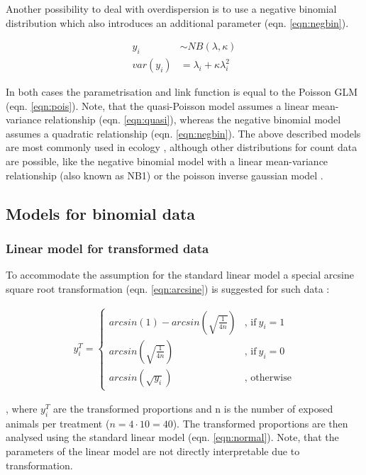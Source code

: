 \documentclass{scrartcl}
\begin{document}
Another possibility to deal with overdispersion is to use a negative binomial distribution which also introduces an additional parameter (eqn. \ref{eqn:negbin}).

\begin{align}
  y_i &\sim NB(\lambda, \kappa) \label{eqn:negbin}  \\
  var(y_i) &= \lambda_i + \kappa \lambda_i^2 \nonumber
\end{align}

In both cases the parametrisation and link function is equal to the Poisson GLM (eqn. \ref{eqn:pois}).
Note, that the quasi-Poisson model assumes a linear mean-variance relationship (eqn. \ref{eqn:quasi}), whereas the negative binomial model assumes a quadratic relationship (eqn. \ref{eqn:negbin}).
The above described models are most commonly used in ecology \citep{ver_hoef_quasi-poisson_2007}, although other distributions for count data are possible, like the negative binomial model with a linear mean-variance relationship (also known as NB1) or the poisson inverse gaussian model \citep{hilbe_modeling_2014}.


\subsection{Models for binomial data}
\subsubsection{Linear model for transformed data}
To accommodate the assumption for the standard linear model a special arcsine square root transformation (eqn. \ref{eqn:arcsine}) is suggested for such  data \citep{epa_methods_2002,newman_quantitative_2012}:

\begin{align}
  y_i^T = 
  \begin{cases}  
    arcsin(1) - arcsin(\sqrt{\frac{1}{4n}}) & \text{, if}\ y_i = 1 \\
    arcsin(\sqrt{\frac{1}{4n}}) & \text{, if}\ y_i = 0  \\
    arcsin(\sqrt{y_i}) & \text{, otherwise}
  \end{cases} \label{eqn:arcsine}
\end{align}

, where $y_i^T$ are the transformed proportions and n is the number of exposed animals per treatment ($n = 4 \cdot 10=40$).
The transformed proportions are then analysed using the standard linear model (eqn. \ref{eqn:normal}).
Note, that the parameters of the linear model are not directly interpretable due to transformation.
\end{document}
